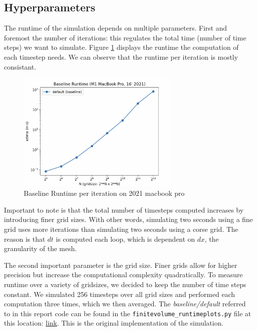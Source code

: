 \documentclass[a4paper,10pt]{article}
\begin{document}
\subsection{Hyperparameters}
The runtime of the simulation depends on multiple parameters.
First and foremost the number of iterations:
this regulates the total time (number of time steps) we want to simulate.
Figure \ref{fig:runtime_per_iteration} displays the runtime the computation of each timestep needs.
We can observe that the runtime per iteration is mostly consistant.
\begin{figure}[h]
  \centering
  \includegraphics[width=0.7\textwidth]{images/baseline/baseline_performance.png}
  \caption{Baseline Runtime per iteration on 2021 macbook pro}
  \label{fig:runtime_per_iteration}
\end{figure}
Important to note is that the total number of timesteps computed increases by introducing finer grid sizes.
With other words, simulating two seconds using a fine grid uses more iterations than simulating two seconds using a corse grid. 
The reason is that $dt$ is computed each loop, which is dependent on $dx$, the granularity of the mesh.

The second important parameter is the grid size.
Finer grids allow for higher precision but increase the computational complexity quadratically.
To measure runtime over a variety of gridsizes, we decided to keep the number of time steps constant.
We simulated 256 timesteps over all grid sizes and performed each computation three times, which we then averaged. The \textit{baseline/default} referred to in this report code can be found in the \verb|finitevolume_runtimeplots.py| file at this location: \href{https://github.com/paulmyr/DD2358-HPC25/blob/master/10_project_rishi_paul/code/finitevolume_runtimeplots.py}{link}. This is the original implementation of the simulation.
\end{document}
